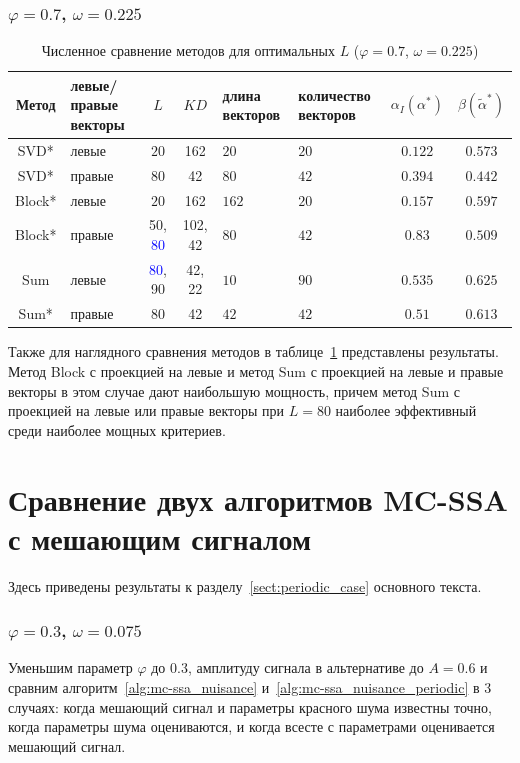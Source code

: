 \documentclass[specialist,
substylefile = spbu_report.rtx,
subf,href,colorlinks=true, 12pt]{disser}
\theoremstyle{definition}
\begin{document}
\subsubsection{$\varphi=0.7$, $\omega=0.225$}
\begin{table}[h]
	\caption{Численное сравнение методов для оптимальных $L$ ($\varphi=0.7$, $\omega=0.225$)}
	\label{tab:res_mc-mssa_omega0225}
	\centering
	\begin{tabular}{|c>{\centering\arraybackslash}m{1in}cc>{\centering\arraybackslash}m{1in} >{\centering\arraybackslash}m{1in}cc|}\hline
		Метод & левые/правые векторы & $L$ & $KD$ & длина векторов & количество векторов & $\alpha_I(\alpha^*)$ & $\beta(\widetilde{\alpha}^*)$ \\
		\hline
		SVD* & левые & $20$ & 162 & $20$ & $20$ & $0.122$ & $0.573$ \\
		\hline
		SVD* & правые & $80$ & 42 & $80$ & $42$ & $0.394$ & $0.442$ \\
		\hline
		Block* & левые & $20$ & 162 & $162$ & $20$ & $0.157$ & $\mathbf{0.597}$ \\
		\hline
		Block* & правые & 50, \textcolor{blue}{80} & 102, 42 & $80$ & $42$ & $0.83$ & $0.509$\\
		\hline
		Sum & левые & \textcolor{blue}{80}, 90 & 42, 22 & $10$ & $90$ & $0.535$ & $\mathbf{0.625}$ \\
		\hline
		Sum* & правые & $80$ & 42 & $42$ & $42$ & $0.51$ & $\mathbf{0.613}$ \\
		\hline
	\end{tabular}
\end{table}

Также для наглядного сравнения методов в таблице~\ref{tab:res_mc-mssa_omega0225} представлены результаты. Метод Block с проекцией на левые и метод Sum с проекцией на левые и правые векторы в этом случае дают наибольшую мощность, причем метод Sum с проекцией на левые или правые векторы при $L=80$ наиболее эффективный среди наиболее мощных критериев.


\section{Сравнение двух алгоритмов MC-SSA с мешающим сигналом}\label{appendix:mc-ssa_nuisance_comp_tables}
Здесь приведены результаты к разделу~\ref{sect:periodic_case} основного текста.
\subsubsection{$\varphi=0.3$, $\omega=0.075$}
Уменьшим параметр $\varphi$ до $0.3$, амплитуду сигнала в альтернативе до $A=0.6$ и сравним алгоритм~\ref{alg:mc-ssa_nuisance} и~\ref{alg:mc-ssa_nuisance_periodic} в 3 случаях: когда мешающий сигнал и параметры красного шума известны точно, когда параметры шума оцениваются, и когда всесте с параметрами оценивается мешающий сигнал.
\end{document}
